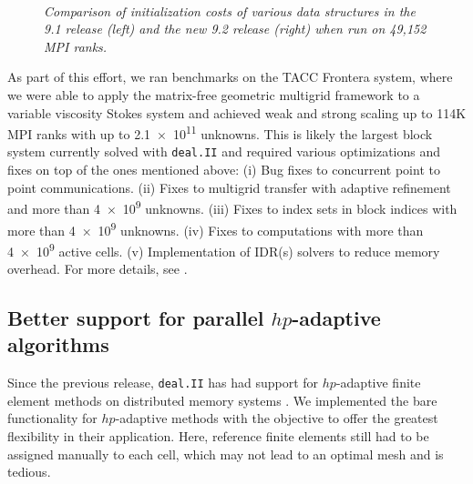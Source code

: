 \documentclass{ansarticle-preprint}
\newcommand{\specialword}[1]{\texttt{#1}}
\newcommand{\dealii}{{\specialword{deal.II}}\xspace}
\begin{document}
\begin{figure}
  \\
  \strut\hfill{}\hfill\strut
  \caption{\it Comparison of initialization costs of various data structures in the 9.1 release (left) and the new 9.2 release (right) when run on 49,152 MPI ranks.}
  \label{fig:init_costs}
\end{figure}


As part of this effort, we ran benchmarks on the TACC Frontera system, where we were
able to apply the matrix-free geometric multigrid framework to a variable viscosity
Stokes system and achieved weak and strong scaling up to 114K MPI ranks with up to
\num{2.1e11} unknowns. This is likely the largest block system currently solved with
\dealii{} and required various optimizations
and fixes on top of the ones mentioned above:
(i) Bug fixes to concurrent point to point communications.
(ii) Fixes to multigrid transfer with adaptive refinement and more than \num{4e9} unknowns.
(iii) Fixes to index sets in block indices with more than \num{4e9} unknowns.
(iv) Fixes to computations with more than \num{4e9} active cells.
(v) Implementation of IDR(s) solvers to reduce memory overhead.
For more details, see \cite{clevenger_stokes19}.

\subsection{Better support for parallel $hp$-adaptive algorithms}
\label{subsec:hp}

Since the previous release, \dealii{} has had support for $hp$-adaptive finite element methods
on distributed memory systems \cite{dealII91}. We implemented the bare functionality
for $hp$-adaptive methods with the objective to offer the greatest flexibility in
their application. Here, reference finite elements still had to be assigned manually
to each cell, which may not lead to an optimal mesh and is tedious.
\end{document}
